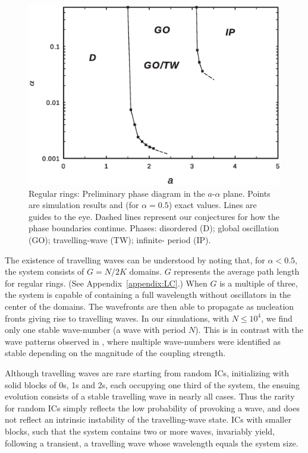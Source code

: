 \begin{figure}[b]
\begin{center}
    \includegraphics[width=1.\textwidth]{fig/chap2/phasediag.eps}
\caption{\label{fig:phase_diagram} Regular rings: Preliminary phase diagram in the $a$-$\alpha$ plane.  Points are simulation results
and (for $\alpha=0.5$) exact values.  Lines are guides to the eye.  Dashed lines represent our conjectures for how the phase boundaries
continue.  Phases: disordered (D); global oscillation (GO); travelling-wave (TW); infinite- period (IP).}
\end{center}
\end{figure}

The existence of travelling waves can be understood by noting that, for $\alpha<0.5$, the system consists of $G=N/2K$ domains. $G$
represents the average path length for regular rings. (See Appendix~\ref{appendix:LC}.) When $G$ is a multiple of three, the system is
capable of containing a full wavelength without oscillators in the center of the domains. The wavefronts are then able to propagate as
nucleation fronts \cite{assis2011infinite} giving rise to travelling waves. In our simulations, with $N \leq10^4$, we find only one
stable wave-number (a wave with period $N$). This is in contrast with the wave patterns observed in \cite{escaff2014arrays}, where
multiple wave-numbers were identified as stable depending on the magnitude of the coupling strength.

Although travelling waves are rare starting from random ICs, initializing with solid blocks of 0s, 1s and 2s, each occupying one third
of the system, the ensuing evolution consists of a stable travelling wave in nearly all cases.  Thus the rarity for random ICs simply
reflects the low probability of provoking a wave, and does not reflect an intrinsic instability of the travelling-wave state.  ICs with
smaller blocks, such that the system contains two or more waves, invariably yield, following a transient, a travelling wave whose
wavelength equals the system size.



